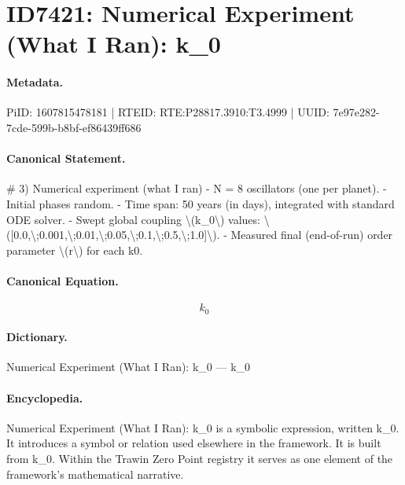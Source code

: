 \section*{ID7421: Numerical Experiment (What I Ran): k\_0}
\paragraph{Metadata.}
PiID: 1607815478181 | RTEID: RTE:P28817.3910:T3.4999 | UUID: 7e97e282-7cde-599b-b8bf-ef86439ff686

\paragraph{Canonical Statement.}
\# 3) Numerical experiment (what I ran) - N = 8 oscillators (one per planet). - Initial phases random. - Time span: 50 years (in days), integrated with standard ODE solver. - Swept global coupling \textbackslash{}(k\_0\textbackslash{}) values: \textbackslash{}([0.0,\textbackslash{};0.001,\textbackslash{};0.01,\textbackslash{};0.05,\textbackslash{};0.1,\textbackslash{};0.5,\textbackslash{};1.0]\textbackslash{}). - Measured final (end-of-run) order parameter \textbackslash{}(r\textbackslash{}) for each k0.

\paragraph{Canonical Equation.}
\[
k_0
\]

\paragraph{Dictionary.}
Numerical Experiment (What I Ran): k\_0 — k\_0

\paragraph{Encyclopedia.}
Numerical Experiment (What I Ran): k\_0 is a symbolic expression, written k\_0. It introduces a symbol or relation used elsewhere in the framework. It is built from k\_0. Within the Trawin Zero Point registry it serves as one element of the framework's mathematical narrative.
